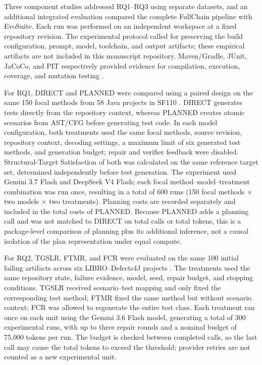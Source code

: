 \documentclass[pdflatex,sn-basic,Numbered,iicol]{sn-jnl}
\begin{document}
Three component studies addressed RQ1--RQ3 using separate datasets, and an additional integrated evaluation compared the complete FullChain pipeline with EvoSuite. Each run was performed on an independent workspace at a fixed repository revision. The experimental protocol called for preserving the build configuration, prompt, model, toolchain, and output artifacts; these empirical artifacts are not included in this manuscript repository. Maven/Gradle, JUnit, JaCoCo, and PIT respectively provided evidence for compilation, execution, coverage, and mutation testing \cite{bib35,bib33,bib34}.

For RQ1, DIRECT and PLANNED were compared using a paired design on the same 150 focal methods from 58 Java projects in SF110 \cite{bib37}. DIRECT generates tests directly from the repository context, whereas PLANNED creates atomic scenarios from AST/CFG before generating test code. In each model configuration, both treatments used the same focal methods, source revision, repository context, decoding settings, a maximum limit of six generated test methods, and generation budget; repair and verifier feedback were disabled. Structural-Target Satisfaction of both was calculated on the same reference target set, determined independently before test generation. The experiment used Gemini 3.7 Flash and DeepSeek V4 Flash; each focal method--model--treatment combination was run once, resulting in a total of 600 runs (150 focal methods \ensuremath{\times} two models \ensuremath{\times} two treatments). Planning costs are recorded separately and included in the total costs of PLANNED. Because PLANNED adds a planning call and was not matched to DIRECT on total calls or total tokens, this is a package-level comparison of planning plus its additional inference, not a causal isolation of the plan representation under equal compute.

For RQ2, TGSLR, FTMR, and FCR were evaluated on the same 100 initial failing artifacts across six LIBRO--Defects4J projects \cite{bib38,bib36}. The treatments used the same repository state, failure evidence, model, seed, repair budget, and stopping conditions. TGSLR received scenario--test mapping and only fixed the corresponding test method; FTMR fixed the same method but without scenario context; FCR was allowed to regenerate the entire test class. Each treatment ran once on each unit using the Gemini 3.6 Flash model, generating a total of 300 experimental runs, with up to three repair rounds and a nominal budget of 75,000 tokens per run. The budget is checked between completed calls, so the last call may cause the total tokens to exceed the threshold; provider retries are not counted as a new experimental unit.
\end{document}
